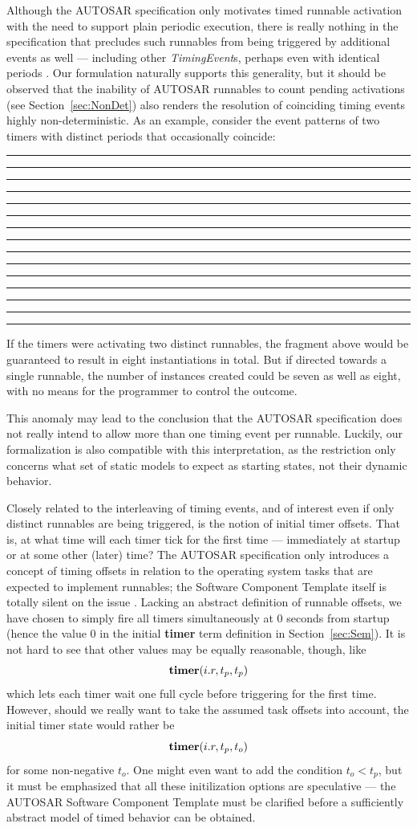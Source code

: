\documentclass[10pt,conference]{IEEEtran}
\begin{document}
Although the AUTOSAR specification only motivates timed runnable activation with the need to support plain periodic execution, there is really nothing in the specification that precludes such runnables from being triggered by additional events as well --- including other \emph{TimingEvent}s, perhaps even with identical periods \cite[table~7.1, ch.~7.2.3]{AR:SWC}. Our formulation naturally supports this generality, but it should be observed that the inability of AUTOSAR runnables to count pending activations (see Section~\ref{sec:NonDet}) also renders the resolution of coinciding timing events highly non-deterministic. As an example, consider the event patterns of two timers with distinct periods that occasionally coincide:
\begin{center}
\rule{3mm}{1pt}%
						\rule[-9pt]{1mm}{10pt}%
\rule{2mm}{1pt}%
													\rule{1mm}{10pt}%
\rule{7mm}{1pt}%
						\rule[-9pt]{1mm}{10pt}%
\rule{1mm}{1pt}%
													\rule{1mm}{10pt}%
\rule{9mm}{1pt}%
									\rule[-9pt]{1mm}{19pt}%
\rule{9mm}{1pt}%
													\rule{1mm}{10pt}%
\rule{1mm}{1pt}%
						\rule[-9pt]{1mm}{10pt}%
\rule{4mm}{1pt}%
\end{center}
If the timers were activating two distinct runnables, the fragment above would be guaranteed to result in eight instantiations in total. But if directed towards a single runnable, the number of instances created could be seven as well as eight, with no means for the programmer to control the outcome.

This anomaly may lead to the conclusion that the AUTOSAR specification does not really intend to allow more than one timing event per runnable. Luckily, our formalization is also compatible with this interpretation, as the restriction only concerns what set of static models to expect as starting states, not their dynamic behavior.

Closely related to the interleaving of timing events, and of interest even if only distinct runnables are being triggered, is the notion of initial timer offsets. That is, at what time will each timer tick for the first time --- immediately at startup or at some other (later) time? The AUTOSAR specification only introduces a concept of timing offsets in relation to the operating system tasks that are expected to implement runnables; the Software Component Template itself is totally silent on the issue \cite{AR:SWC}. Lacking an abstract definition of runnable offsets, we have chosen to simply fire all timers simultaneously at $0$ seconds from startup (hence the value $0$ in the initial {\bf timer} term definition in Section~\ref{sec:Sem}). It is not hard to see that other values may be equally reasonable, though, like
$$
	\textbf{timer}(i.r,t_p,t_p)
$$
which lets each timer wait one full cycle before triggering for the first time. However, should we really want to take the assumed task offsets into account, the initial timer state would rather be
$$
	\textbf{timer}(i.r,t_p,t_o)
$$
for some non-negative $t_o$. One might even want to add the condition $t_o < t_p$, but it must be emphasized that all these initilization options are speculative --- the AUTOSAR Software Component Template must be clarified before a sufficiently abstract model of timed behavior can be obtained.
\end{document}

